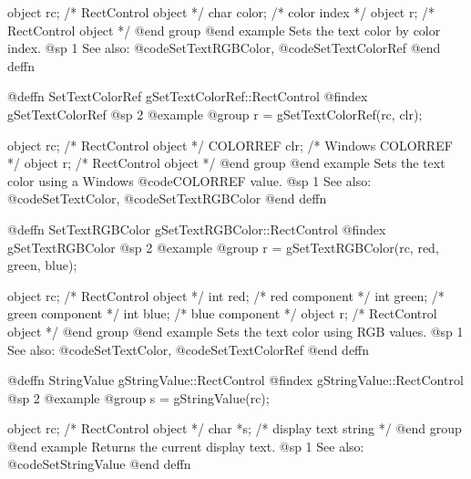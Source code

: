 object  rc;     /*  RectControl object  */
char    color;  /*  color index         */
object  r;      /*  RectControl object  */
@end group
@end example
Sets the text color by color index.
@sp 1
See also:  @code{SetTextRGBColor}, @code{SetTextColorRef}
@end deffn



@deffn {SetTextColorRef} gSetTextColorRef::RectControl
@findex gSetTextColorRef
@sp 2
@example
@group
r = gSetTextColorRef(rc, clr);

object    rc;    /*  RectControl object  */
COLORREF  clr;   /*  Windows COLORREF    */
object    r;     /*  RectControl object  */
@end group
@end example
Sets the text color using a Windows @code{COLORREF} value.
@sp 1
See also:  @code{SetTextColor}, @code{SetTextRGBColor}
@end deffn



@deffn {SetTextRGBColor} gSetTextRGBColor::RectControl
@findex gSetTextRGBColor
@sp 2
@example
@group
r = gSetTextRGBColor(rc, red, green, blue);

object  rc;     /*  RectControl object  */
int     red;    /*  red component       */
int     green;  /*  green component     */
int     blue;   /*  blue component      */
object  r;      /*  RectControl object  */
@end group
@end example
Sets the text color using RGB values.
@sp 1
See also:  @code{SetTextColor}, @code{SetTextColorRef}
@end deffn



@deffn {StringValue} gStringValue::RectControl
@findex gStringValue::RectControl
@sp 2
@example
@group
s = gStringValue(rc);

object  rc;   /*  RectControl object   */
char    *s;   /*  display text string  */
@end group
@end example
Returns the current display text.
@sp 1
See also:  @code{SetStringValue}
@end deffn
